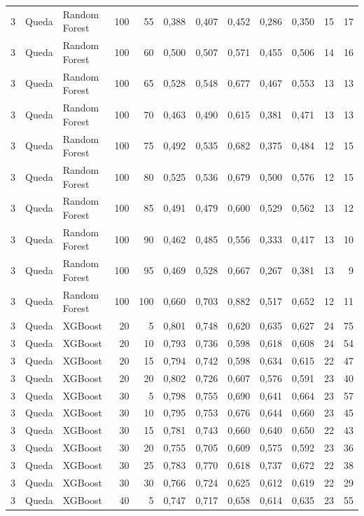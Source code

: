 \begin{longtable}{@{}rllrrrrrrrrr@{}}
3 & Queda & Random Forest & 100 & 55 & 0,388 & 0,407 & 0,452 & 0,286 & 0,350 & 15 & 17 \\
3 & Queda & Random Forest & 100 & 60 & 0,500 & 0,507 & 0,571 & 0,455 & 0,506 & 14 & 16 \\
3 & Queda & Random Forest & 100 & 65 & 0,528 & 0,548 & 0,677 & 0,467 & 0,553 & 13 & 13 \\
3 & Queda & Random Forest & 100 & 70 & 0,463 & 0,490 & 0,615 & 0,381 & 0,471 & 13 & 13 \\
3 & Queda & Random Forest & 100 & 75 & 0,492 & 0,535 & 0,682 & 0,375 & 0,484 & 12 & 15 \\
3 & Queda & Random Forest & 100 & 80 & 0,525 & 0,536 & 0,679 & 0,500 & 0,576 & 12 & 15 \\
3 & Queda & Random Forest & 100 & 85 & 0,491 & 0,479 & 0,600 & 0,529 & 0,562 & 13 & 12 \\
3 & Queda & Random Forest & 100 & 90 & 0,462 & 0,485 & 0,556 & 0,333 & 0,417 & 13 & 10 \\
3 & Queda & Random Forest & 100 & 95 & 0,469 & 0,528 & 0,667 & 0,267 & 0,381 & 13 & 9 \\
3 & Queda & Random Forest & 100 & 100 & 0,660 & 0,703 & 0,882 & 0,517 & 0,652 & 12 & 11 \\
3 & Queda & XGBoost & 20 & 5 & 0,801 & 0,748 & 0,620 & 0,635 & 0,627 & 24 & 75 \\
3 & Queda & XGBoost & 20 & 10 & 0,793 & 0,736 & 0,598 & 0,618 & 0,608 & 24 & 54 \\
3 & Queda & XGBoost & 20 & 15 & 0,794 & 0,742 & 0,598 & 0,634 & 0,615 & 22 & 47 \\
3 & Queda & XGBoost & 20 & 20 & 0,802 & 0,726 & 0,607 & 0,576 & 0,591 & 23 & 40 \\
3 & Queda & XGBoost & 30 & 5 & 0,798 & 0,755 & 0,690 & 0,641 & 0,664 & 23 & 57 \\
3 & Queda & XGBoost & 30 & 10 & 0,795 & 0,753 & 0,676 & 0,644 & 0,660 & 23 & 45 \\
3 & Queda & XGBoost & 30 & 15 & 0,781 & 0,743 & 0,660 & 0,640 & 0,650 & 22 & 43 \\
3 & Queda & XGBoost & 30 & 20 & 0,755 & 0,705 & 0,609 & 0,575 & 0,592 & 23 & 36 \\
3 & Queda & XGBoost & 30 & 25 & 0,783 & 0,770 & 0,618 & 0,737 & 0,672 & 22 & 38 \\
3 & Queda & XGBoost & 30 & 30 & 0,766 & 0,724 & 0,625 & 0,612 & 0,619 & 22 & 29 \\
3 & Queda & XGBoost & 40 & 5 & 0,747 & 0,717 & 0,658 & 0,614 & 0,635 & 23 & 55 \\

\end{longtable}
